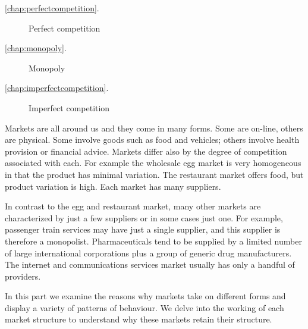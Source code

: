 
{\large\color{parttextcolour}
\begin{description}
\item[\textmd{\ref{chap:perfectcompetition}.}] Perfect competition

\item[\textmd{\ref{chap:monopoly}.}] Monopoly

\item[\textmd{\ref{chap:imperfectcompetition}.}] Imperfect competition
\end{description}
}

\vspace{1cm}

Markets are all around us and they come in many forms. Some are on-line, others are physical. Some involve goods such as food and vehicles; others involve health provision or financial advice. Markets differ also by the degree of competition associated with each. For example the wholesale egg market is very homogeneous in that the product has minimal variation. The restaurant market offers food, but product variation is high. Each market has many suppliers.

In contrast to the egg and restaurant market, many other markets are characterized by just a few suppliers or in some cases just one. For example, passenger train services may have just a single supplier, and this supplier is therefore a monopolist. Pharmaceuticals tend to be supplied by a limited number of large international corporations plus a group of generic drug manufacturers. The internet and communications services market usually has only a handful of providers.

In this part we examine the reasons why markets take on different forms and display a variety of patterns of behaviour. We delve into the working of each market structure to understand why these markets retain their structure.
